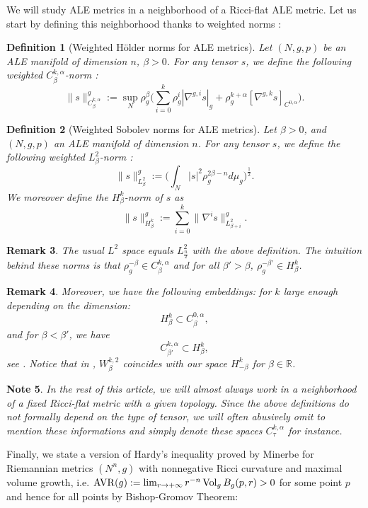 \documentclass[a4paper,11pt,reqno]{amsart}
\newtheorem{defn}{Definition}[section]
\newtheorem{rk}[defn]{Remark}
\newtheorem{note}[defn]{Note}
\def\RR{\mathbb{R}}
\def\vol{\mathop{\rm vol}\nolimits}
\def\vol{\mathop{\rm Vol}\nolimits}
\def\AVR{\mathop{\rm AVR}\nolimits}
\def\vol{\mathop{\rm vol}\nolimits}
\def\vol{\mathop{\rm Vol}\nolimits}
\def\AVR{\mathop{\rm AVR}\nolimits}
\numberwithin{equation}{section}
\begin{document}
	We will study ALE metrics in a neighborhood of a Ricci-flat ALE metric. Let us start by defining this neighborhood thanks to weighted norms :
	
	\begin{defn}[Weighted Hölder norms for ALE metrics]\label{def-weighted-norms}
		Let $(N,g,p)$ be an ALE manifold of dimension $n$, $\beta>0$. For any tensor $s$, we define the following weighted $C^{k,\alpha}_\beta$-norm :
		$$\| s \|^g_{C^{k,\alpha}_\beta} := \sup_{N}\rho_g^\beta\Big( \sum_{i=0}^k\rho_g^{i}|\nabla^{g,i} s|_{g} + \rho_g^{k+\alpha}[\nabla^{g,k}s]_{C^{0,\alpha}}\Big).$$
	\end{defn}
	
	\begin{defn}[Weighted Sobolev norms for ALE metrics]\label{def-weighted-sobolev-norms}
		Let $\beta>0$, and $(N,g,p)$ an ALE manifold of dimension $n$. For any tensor $s$, we define the following weighted $L_\beta^2$-norm :
		$$\| s \|_{L^{2}_{\beta}} ^g:= \Big(\int_N |s|^2 \rho_{g}^{2\beta-n}d\mu_{g}\Big)^\frac{1}{2}.$$
		We moreover define the $H^k_{\beta}$-norm of $s$ as 
		$$\|s\|_{H^k_\beta}^g:= \sum_{i= 0}^k {\|\nabla^i s \|^g_{L^{2}_{\beta+i}}}.$$	
	\end{defn}
	
	\begin{rk}
		The usual $L^2$ space equals $L^2_\frac{n}{2}$ with the above definition. The intuition behind these norms is that $ \rho_{g}^{-\beta}\in C^{k,\alpha}_\beta$ and for all $\beta'>\beta$, $\rho_{g}^{-\beta'}\in H^k_\beta$. 
	\end{rk}
	
	\begin{rk}\label{sobolev embeddings}
		Moreover, we have the following embeddings: for $k$ large enough depending on the dimension: $$H^k_\beta\subset C^{0,\alpha}_\beta,$$ and for $\beta<\beta'$, we have $$C^{k,\alpha}_{\beta'}\subset H^k_\beta,$$ see \cite[Theorem $1.2$]{Bart-Mass}. Notice that in \cite{Bart-Mass}, $W^{k,2}_{\beta}$ coincides with our space $H^k_{-\beta}$ for $\beta\in\RR$.
	\end{rk}
	
	\begin{note}
		In the rest of this article, we will almost always work in a neighborhood of a fixed Ricci-flat metric with a given topology. Since the above definitions do not formally depend on the type of tensor, we will often abusively omit to mention these informations and simply denote these spaces $C^{k,\alpha}_\tau$ for instance.
	\end{note}
	Finally, we state a version of Hardy's inequality proved by Minerbe \cite{Min-Har-Ine} for Riemannian metrics $(N^n,g)$ with nonnegative Ricci curvature and maximal volume growth, i.e. $\AVR(g):=\lim_{r\rightarrow+\infty}r^{-n}\vol_gB_g(p,r)>0$ for some point $p$ and hence for all points by Bishop-Gromov Theorem:
	
\end{document}
